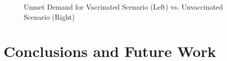 \documentclass{article}
\begin{document}
\begin{figure}
    \caption{Unmet Demand for Vaccinated Scenario (Left) vs. Unvaccinated Scenario (Right)}
    \label{fig:unmetDemand}
\end{figure}

\section{Conclusions and Future Work}

\printbibliography[heading=subbibintoc, title={References}]


%
%
\end{document}
